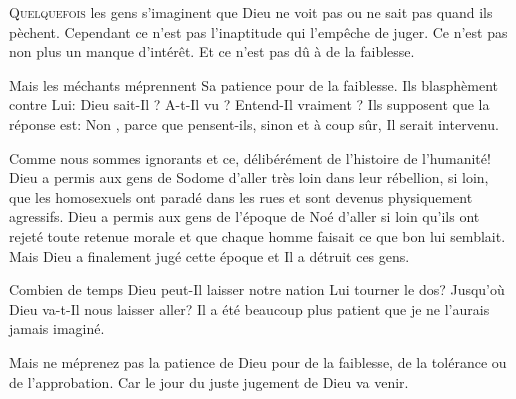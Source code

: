 

\lettrine{Q}{uelquefois} les gens s'imaginent que Dieu ne voit pas
 ou ne sait pas quand ils pèchent.
 Cependant ce n'est pas l'inaptitude qui l'empêche de juger.
 Ce n'est pas non plus un manque d'intérêt.
 Et ce n'est pas dû à de la faiblesse.


Mais les méchants méprennent Sa patience pour de la faiblesse.
 Ils blasphèment contre Lui:
 \Og Dieu sait-Il ? A-t-Il vu ? Entend-Il vraiment ? \Fg{}
 Ils supposent que la réponse est: \Og Non \Fg{},
 parce que pensent-ils, sinon et à coup sûr, Il serait intervenu.

Comme nous sommes ignorants \ocadr et ce, délibérément \fcadr{}
 de l'histoire de l'humanité!
 Dieu a permis aux gens de Sodome d'aller très loin dans leur rébellion,
 si loin, que les homosexuels ont paradé dans les rues et sont devenus
 physiquement agressifs.
 Dieu a permis aux gens de l'époque de Noé d'aller si loin qu'ils ont
 rejeté toute retenue morale et que chaque homme faisait ce que bon
 lui semblait.
 Mais Dieu a finalement jugé cette époque et Il a détruit ces gens.

Combien de temps Dieu peut-Il laisser notre nation Lui tourner le dos?
 Jusqu'où Dieu va-t-Il nous laisser aller?
 Il a été beaucoup plus patient que je ne l'aurais jamais imaginé.

Mais ne méprenez pas la patience de Dieu pour de la faiblesse,
 de la tolérance ou de l'approbation.
 Car le jour du juste jugement de Dieu va venir.

\dvrule





